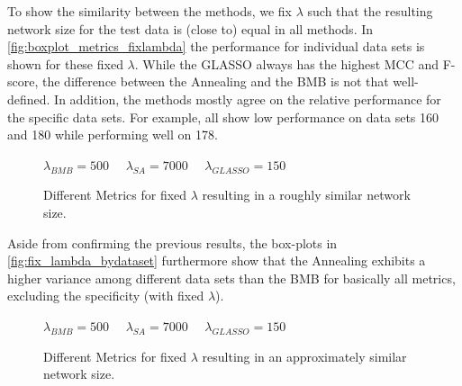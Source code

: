To show the similarity between the methods, we fix $\lambda$ such that the resulting network size for the test data is (close to) equal in all methods.
In \autoref{fig:boxplot_metrics_fixlambda}  the performance for individual data sets is shown for these fixed $\lambda$. 
While the GLASSO always has the highest MCC and F-score, the difference between the Annealing and the BMB is not that well-defined.
In addition, the methods mostly agree on the relative performance for the specific data sets.
For example, all show low performance on data sets 160 and 180 while performing well on 178.
\begin{figure}
	\centering
	\caption{Different Metrics for fixed $\lambda$ resulting in a roughly similar network size.}
	\label{fig:fix_lambda_bydataset}
	$\lambda_{BMB}=500 \quad$
	$\lambda_{SA}=7000\quad$
	$\lambda_{GLASSO}=150$
\end{figure}
Aside from confirming the previous results, the box-plots in \autoref{fig:fix_lambda_bydataset} furthermore show that the Annealing exhibits a higher variance among different data sets than the BMB for basically all metrics, excluding the specificity (with fixed $\lambda$).

\begin{figure}
	\centering
	\caption{Different Metrics for fixed $\lambda$ resulting in an approximately similar network size.}
	\label{fig:boxplot_metrics_fixlambda}
	$\lambda_{BMB}=500 \quad$
	$\lambda_{SA}=7000\quad$
	$\lambda_{GLASSO}=150$
\end{figure}

